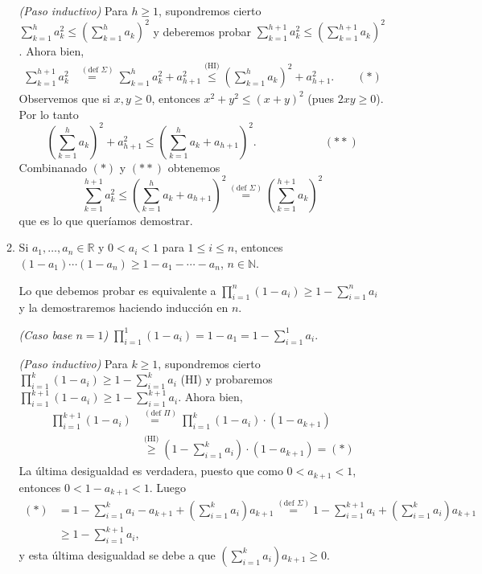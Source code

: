 \begin{enumerate}
\begin{enumerate}
        \textit{(Paso inductivo)}  Para  $h \ge 1$,  supondremos cierto $\sum_{k=1}^h a_{k}^{2}\leq \left(\sum_{k=1}^h a_{k}\right)^{2}$ y deberemos  probar $\sum_{k=1}^{h+1} a_{k}^{2}\leq \left(\sum_{k=1}^{h+1} a_{k}\right)^{2}$.  Ahora bien,
        \begin{align*}
        \sum_{k=1}^{h+1} a_{k}^{2} &\overset{(\text{def } \Sigma)}{=\quad} \sum_{k=1}^h a_{k}^{2} + a_{h+1}^{2} \overset{\text{(HI)}}{\leq} \left(\sum_{k=1}^h a_{k}\right)^{2} + a_{h+1}^{2}. \qquad (*)
        \end{align*}
        Observemos que si $x,y \ge 0$,  entonces $x^2 + y^2 \leq (x+y)^2$ (pues $2xy \ge 0$). Por lo tanto 
        \begin{equation*}
             \left(\sum_{k=1}^h a_{k}\right)^{2} + a_{h+1}^{2} \leq  \left(\sum_{k=1}^h a_{k}+a_{h+1}\right)^{2}. \qquad\qquad\qquad (**)
        \end{equation*}
        Combinanado $(*)$ y $(**)$ obtenemos
        \begin{equation*}
            \sum_{k=1}^{h+1} a_{k}^{2} \leq \left(\sum_{k=1}^h a_{k}+a_{h+1}\right)^{2} \overset{(\text{def } \Sigma)}{=} \left(\sum_{k=1}^{h+1} a_{k}\right)^{2}
        \end{equation*}
        que es lo que queríamos demostrar. 
        
        \item Si $a_1,\dots,a_n \in \mathbb R$ y $0<a_i<1$ para $1 \le i\le n$, entonces $(1-a_1)\cdots(1-a_n)\ge 1-a_1-\cdots -a_n$, $n\in \mathbb N$.
        
        \rta Lo que debemos probar es equivalente a $\prod_{i=1}^{n} (1-a_i) \ge 1 - \sum_{i=1}^{n} a_i$ y la demostraremos haciendo inducción en $n$.  
        
        \textit{(Caso base $n=1$)} $\prod_{i=1}^{1} (1-a_i) = 1-a_1 = 1 - \sum_{i=1}^{1} a_i$.
        
        \textit{(Paso inductivo)}  Para  $k \ge 1$,  supondremos cierto  $\prod_{i=1}^{k} (1-a_i) \ge 1 - \sum_{i=1}^{k} a_i$ (HI) y probaremos  $\prod_{i=1}^{k+1} (1-a_i) \ge 1 - \sum_{i=1}^{k+1} a_i$. Ahora bien, 
        \begin{align*}
        \prod_{i=1}^{k+1} (1-a_i) &\overset{(\text{def } \Pi)}{=\quad} \prod_{i=1}^{k} (1-a_i)\cdot (1-a_{k+1})\\
        &\overset{\text{(HI)}}{\ge}  (1 - \sum_{i=1}^{k} a_i)\cdot (1-a_{k+1}) =(*)
        \end{align*}
        La última desigualdad es verdadera, puesto  que como $0<a_{k+1}<1$, entonces $0<1-a_{k+1}<1$. 
        Luego
        \begin{align*}
            (*)&= 1 - \sum_{i=1}^{k} a_i -a_{k+1} +  (\sum_{i=1}^{k} a_i)a_{k+1} \overset{(\text{def } \Sigma)}{=} 1 - \sum_{i=1}^{k+1} a_i +  (\sum_{i=1}^{k} a_i)a_{k+1} \\
            &\ge  1 - \sum_{i=1}^{k+1} a_i,
        \end{align*}
        y  esta última desigualdad se debe a que $(\sum_{i=1}^{k} a_i)a_{k+1} \ge 0$.
    \end{enumerate}
    

\end{enumerate}

